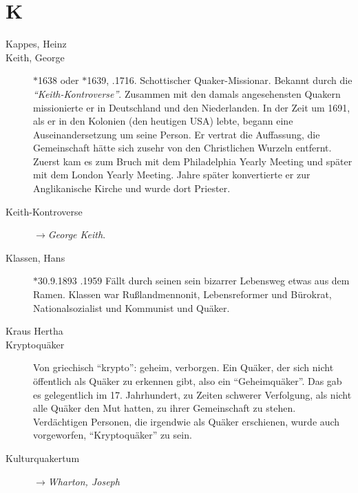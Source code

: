 \section*{K}

\articlesize

\begin{description}

\item[Kappes, Heinz]

 \item[Keith, George] $\ast$1638 oder $\ast$1639, .1716. Schottischer Quaker-Missionar. Bekannt durch die \textit{"`Keith-Kontroverse"'}. Zusammen mit den damals angesehensten Quakern missionierte er in Deutschland und den Niederlanden. In der Zeit um 1691, als er in den Kolonien (den heutigen USA) lebte, begann eine Auseinandersetzung um seine Person. Er vertrat die Auffassung, die Gemeinschaft hätte sich zusehr von den Christlichen Wurzeln entfernt. Zuerst kam es zum Bruch mit dem Philadelphia Yearly Meeting und später mit dem London Yearly Meeting. Jahre später konvertierte er zur Anglikanische Kirche und wurde dort Priester.

 \item[Keith-Kontroverse] $\to$\textit{George Keith}.

 \item[Klassen, Hans] $\ast$30.9.1893 .1959 Fällt durch seinen sein bizarrer Lebensweg etwas aus dem Ramen. Klassen war Rußlandmennonit, Lebensreformer und Bürokrat, Nationalsozialist und Kommunist und Quäker.

 \item[Kraus Hertha]

 \item[Kryptoquäker] Von griechisch "`krypto"': geheim, verborgen. Ein Quäker, der sich nicht öffentlich als Quäker zu erkennen gibt, also ein "`Geheimquäker"'. Das gab es gelegentlich im 17. Jahrhundert, zu Zeiten schwerer Verfolgung, als nicht alle Quäker den Mut hatten, zu ihrer Gemeinschaft zu stehen. Verdächtigen Personen, die irgendwie als Quäker erschienen, wurde auch vorgeworfen, "`Kryptoquäker"' zu sein.

 \item[Kulturquakertum] $\to$\textit{Wharton, Joseph}

 \end{description}
\normalsize
